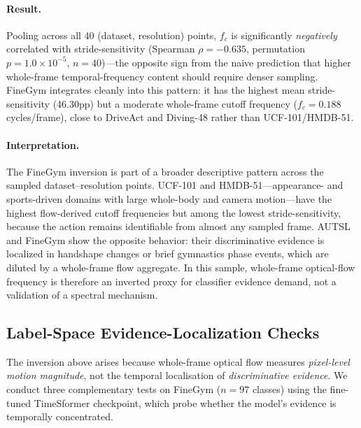 \documentclass[runningheads]{llncs}
\newcommand{\rev}[1]{\textcolor{revblue}{#1}}
\newcommand{\revdel}[1]{}
\begin{document}
\paragraph{Result.} Pooling across all 40 (dataset, resolution) points, $f_c$ is significantly \emph{negatively} correlated with stride-sensitivity (Spearman $\rho=-0.635$, permutation $p=1.0\times10^{-5}$, $n=40$)---the opposite sign from the naive prediction that higher whole-frame temporal-frequency content should require denser sampling. FineGym integrates cleanly into this pattern: it has the highest mean stride-sensitivity (46.30pp) but a moderate whole-frame cutoff frequency ($f_c=0.188$ cycles/frame), close to DriveAct and Diving-48 rather than UCF-101/HMDB-51.

\paragraph{Interpretation.} \revdel{This is the same qualitative inversion already reported for FineGym in the main paper ($r=-0.475$), now shown across all 8 datasets with real statistical power rather than being a single-dataset anomaly.}\rev{The FineGym inversion is part of a broader descriptive pattern across the sampled dataset--resolution points.} UCF-101 and HMDB-51---appearance- and sports-driven domains with large whole-body and camera motion---have the highest flow-derived cutoff frequencies but among the lowest stride-sensitivity, because the action remains identifiable from almost any sampled frame. AUTSL and FineGym show the opposite behavior: their discriminative evidence is localized in handshape changes or brief gymnastics phase events, which are diluted by a whole-frame flow aggregate. \revdel{We conclude that whole-frame optical-flow frequency content is a systematically \emph{anti-correlated}, not merely noisy, proxy for the temporal demand that matters to a classifier.}\rev{In this sample, whole-frame optical-flow frequency is therefore an inverted proxy for classifier evidence demand, not a validation of a spectral mechanism.}

\subsection*{Label-Space Evidence-Localization Checks}

The inversion above arises because whole-frame optical flow measures \emph{pixel-level motion magnitude}, not the temporal localisation of \emph{discriminative evidence}. We conduct three complementary tests on FineGym ($n=97$ classes) using the fine-tuned TimeSformer checkpoint, which probe whether the model's evidence is temporally concentrated.
\end{document}
